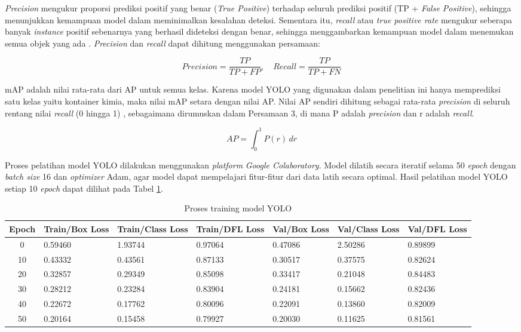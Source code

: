 \textit{Precision} mengukur proporsi prediksi positif yang benar (\textit{True
Positive}) terhadap seluruh prediksi positif (TP + \textit{False Positive}),
sehingga menunjukkan kemampuan model dalam meminimalkan kesalahan
deteksi. Sementara itu, \textit{recall} atau \textit{true positive
rate} mengukur seberapa banyak \textit{instance} positif sebenarnya yang
berhasil dideteksi dengan benar, sehingga menggambarkan kemampuan
model dalam menemukan semua objek yang ada \citep{23}. \textit{Precision} dan
\textit{recall} dapat dihitung menggunakan persamaan:

\begin{equation}
  Precision = \frac{TP}{TP + FP}, \quad
  Recall = \frac{TP}{TP + FN}
\end{equation}

mAP adalah nilai rata-rata dari AP untuk semua kelas. Karena model
YOLO yang digunakan dalam penelitian ini hanya
memprediksi satu kelas yaitu kontainer kimia, maka nilai mAP setara
dengan nilai AP. Nilai AP sendiri dihitung sebagai rata-rata
\textit{precision} di seluruh
rentang nilai \textit{recall} (0 hingga 1) \citep{24}, sebagaimana
dirumuskan dalam
Persamaan 3, di mana P adalah \textit{precision} dan r adalah \textit{recall}.

\begin{equation}
  AP = \int_{0}^{1} P(r) \,dr
\end{equation}

Proses pelatihan model YOLO dilakukan menggunakan \textit{platform}
\textit{Google
Colaboratory}. Model dilatih secara iteratif selama 50 \textit{epoch} dengan
\textit{batch size} 16 dan \textit{optimizer} Adam, agar model dapat mempelajari
fitur-fitur dari data latih secara optimal. Hasil pelatihan model
YOLO setiap 10 \textit{epoch} dapat dilihat pada Tabel \ref{tab:yolo-train}.

\begin{table}[H]
  \caption{Proses training model YOLO}
  \label{tab:yolo-train}
  \vspace{-1em}
  \centering
  \footnotesize
  \begin{tabular}{c p{1.5cm} p{1.5cm} p{1.5cm} p{1.5cm} p{1.5cm} p{1.5cm}}
    \toprule
    \textbf{Epoch} & \textbf{Train/Box Loss} & \textbf{Train/Class Loss}
    & \textbf{Train/DFL Loss} & \textbf{Val/Box Loss}
    & \textbf{Val/Class Loss} & \textbf{Val/DFL Loss} \\
    \midrule
    0 & 0.59460 & 1.93744 & 0.97064 & 0.47086 & 2.50286 & 0.89899 \\
    10 & 0.43332 & 0.43561 & 0.87133 & 0.30517 & 0.37575 & 0.82624 \\
    20 & 0.32857 & 0.29349 & 0.85098 & 0.33417 & 0.21048 & 0.84483 \\
    30 & 0.28212 & 0.23284 & 0.83904 & 0.24181 & 0.15662 & 0.82436 \\
    40 & 0.22672 & 0.17762 & 0.80096 & 0.22091 & 0.13860 & 0.82009 \\
    50 & 0.20164 & 0.15458 & 0.79927 & 0.20030 & 0.11625 & 0.81561 \\
    \bottomrule
  \end{tabular}
  \normalsize
\end{table}

